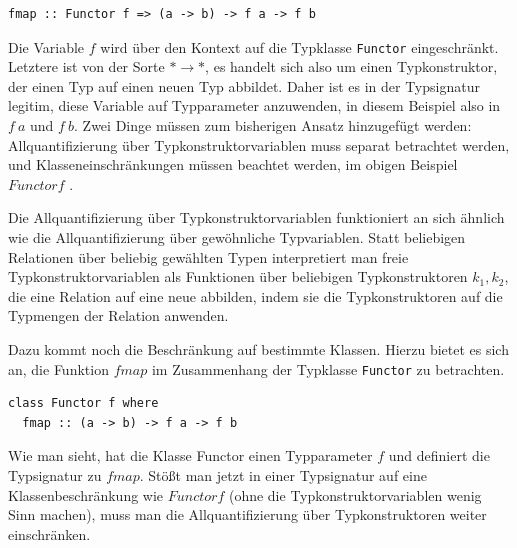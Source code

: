 \begin{verbatim}
fmap :: Functor f => (a -> b) -> f a -> f b
\end{verbatim}

Die Variable $f$ wird über den Kontext auf die Typklasse \texttt{Functor} eingeschränkt. Letztere ist von der Sorte $* \rightarrow *$,
es handelt sich also um einen Typkonstruktor, der einen Typ auf einen neuen Typ abbildet.
Daher ist es in der Typsignatur legitim, diese Variable auf Typparameter anzuwenden, in diesem Beispiel also in $f\ a$ und $f\ b$.
Zwei Dinge müssen zum bisherigen Ansatz hinzugefügt werden: Allquantifizierung über Typkonstruktorvariablen muss separat betrachtet werden,
und Klasseneinschränkungen müssen beachtet werden, im obigen Beispiel $Functor f$ \cite{voigtlander}.

Die Allquantifizierung über Typkonstruktorvariablen funktioniert an sich ähnlich wie die Allquantifizierung über gewöhnliche
Typvariablen. Statt beliebigen Relationen über beliebig gewählten Typen interpretiert man freie Typkonstruktorvariablen als
Funktionen über beliebigen Typkonstruktoren $k_1, k_2$, die eine Relation auf eine neue abbilden, indem sie die Typkonstruktoren
auf die Typmengen der Relation anwenden.

Dazu kommt noch die Beschränkung auf bestimmte Klassen. Hierzu bietet es sich an, die Funktion $fmap$ im Zusammenhang der
Typklasse \texttt{Functor} zu betrachten.

\begin{verbatim}
class Functor f where
  fmap :: (a -> b) -> f a -> f b
\end{verbatim}

Wie man sieht, hat die Klasse Functor einen Typparameter $f$ und definiert die Typsignatur zu $fmap$. Stößt man jetzt in
einer Typsignatur auf eine Klassenbeschränkung wie $Functor f$ (ohne die Typkonstruktorvariablen wenig Sinn machen),
muss man die Allquantifizierung über Typkonstruktoren weiter einschränken.

